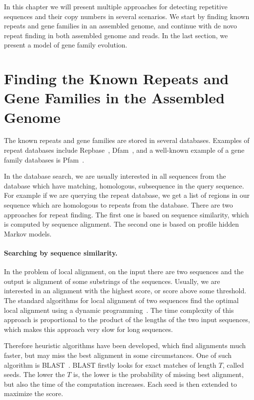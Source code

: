 In this chapter we will present multiple approaches for detecting repetitive sequences and their copy numbers in several scenarios. We start by finding known repeats and gene families in an assembled genome, and continue with de novo repeat finding in both assembled genome and reads. In the last section, we present a model of gene family evolution.

\section[Known Repeats in Assem\dots]{Finding the Known Repeats and Gene Families in the Assembled Genome}

The known repeats and gene families are stored in several databases. Examples of repeat databases include Repbase~\cite{repbase}, Dfam~\cite{dfam}, and a well-known example of a gene family databases is Pfam~\cite{pfam}.

In the database search, we are usually interested in all sequences from the database which have matching, homologous, subsequence in the query sequence. For example if we are querying the repeat database, we get a list of regions in our sequence which are homologous to repeats from the database.
There are two approaches for repeat finding. The first one is based on sequence similarity, which is computed by sequence alignment. The second one is based on profile hidden Markov models.

\paragraph{Searching by sequence similarity.}
In the problem of local alignment, on the input there are two sequences and the output is alignment of some substrings of the sequences. Usually, we are interested in an alignment with the highest score, or score above some threshold.
The standard algorithms for local alignment of two sequences find the optimal local alignment using a dynamic programming~\cite{durbin}. The time complexity of this approach is proportional to the product of the lengths of the two input sequences, which makes this approach very slow for long sequences.

Therefore heuristic algorithms have been developed, which find alignments much faster, but may miss the best alignment in some circumstances. One of such algorithm is BLAST~\cite{blast}.
BLAST firstly looks for exact matches of length $T$, called seeds. The lower the $T$ is, the lower is the probability of missing best alignment, but also the time of the computation increases.
Each seed is then extended to maximize the score.

